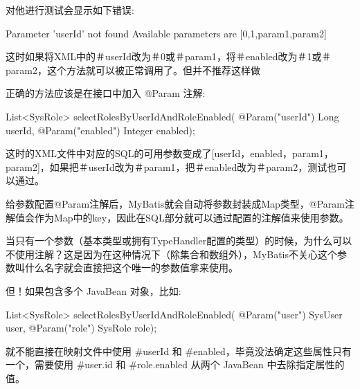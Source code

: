 对他进行测试会显示如下错误:
\begin{xml}
Parameter 'userId' not found
Available parameters are [0,1,param1,param2]
\end{xml}

这时如果将XML中的＃{userId}改为＃{0}或＃{param1}，将＃{enabled}改为＃{1}或＃{param2}，这个方法就可以被正常调用了。但并不推荐这样做

正确的方法应该是在接口中加入 @Param 注解:

\begin{Java}
List<SysRole> selectRolesByUserIdAndRoleEnabled(
    @Param("userId") Long userId, 
    @Param("enabled") Integer enabled);
\end{Java}

这时的XML文件中对应的SQL的可用参数变成了[userId，enabled，param1，param2]，如果把＃{userId}改为＃{param1}，把＃{enabled}改为＃{param2}，测试也可以通过。

给参数配置@Param注解后，MyBatis就会自动将参数封装成Map类型，@Param注解值会作为Map中的key，因此在SQL部分就可以通过配置的注解值来使用参数。

当只有一个参数（基本类型或拥有TypeHandler配置的类型）的时候，为什么可以不使用注解？这是因为在这种情况下（除集合和数组外），MyBatis不关心这个参数叫什么名字就会直接把这个唯一的参数值拿来使用。

但！如果包含多个 JavaBean 对象，比如:
\begin{Java}
List<SysRole> selectRolesByUserIdAndRoleEnabled(
    @Param("user") SysUser user, 
    @Param("role") SysRole role);
\end{Java}

就不能直接在映射文件中使用 \#{userId} 和 \#{enabled}，毕竟没法确定这些属性只有一个，需要使用 \#{user.id} 和 \#{role.enabled} 从两个 JavaBean 中去除指定属性的值。

\newpage